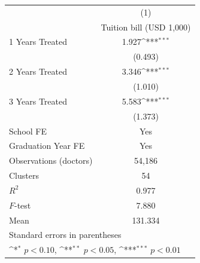 {
\def\sym#1{\ifmmode^{#1}\else\(^{#1}\)\fi}
\begin{tabular}{l*{1}{c}}
\hline\hline
                    &\multicolumn{1}{c}{(1)}\\
                    &\multicolumn{1}{c}{Tuition bill (USD 1,000)}\\
\hline
1 Years Treated     &       1.927\sym{***}\\
                    &     (0.493)         \\
[1em]
2 Years Treated     &       3.346\sym{***}\\
                    &     (1.010)         \\
[1em]
3 Years Treated     &       5.583\sym{***}\\
                    &     (1.373)         \\
[1em]
School FE           &         Yes         \\
[1em]
Graduation Year FE  &         Yes         \\
\hline
Observations (doctors)&      54,186         \\
Clusters            &          54         \\
$R^{2}$             &       0.977         \\
$F$-test            &       7.880         \\
Mean                &     131.334         \\
\hline\hline
\multicolumn{2}{l}{\footnotesize Standard errors in parentheses}\\
\multicolumn{2}{l}{\footnotesize \sym{*} \(p<0.10\), \sym{**} \(p<0.05\), \sym{***} \(p<0.01\)}\\
\end{tabular}
}
